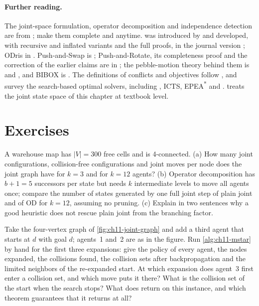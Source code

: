\paragraph{Further reading.}
The joint-space formulation, operator decomposition and independence
detection are from \textcite{standley2010finding}; \textcite{standley2011complete}
make them complete and anytime. \mstar was introduced by
\textcite{wagner2011mstar} and developed, with recursive and inflated
variants and the full proofs, in the journal version
\cite{wagner2015subdimensional}; ODr\mstar is in \cite{ferner2013odrmstar}.
Push-and-Swap is \cite{luna2011push}; Push-and-Rotate, its completeness
proof and the correction of the earlier claims are in \cite{dewilde2014push};
the pebble-motion theory behind them is \cite{kornhauser1984pebble} and
\cite{wilson1974graph}, and BIBOX is \cite{surynek2009novel}. The
definitions of conflicts and objectives follow \textcite{stern2019mapf}, and
\textcite{felner2017search} survey the search-based optimal solvers,
including \cbs, ICTS, EPEA\textsuperscript{*} and \mstar.
\textcite{lavalle2006planning} treats the joint state space of this chapter
at textbook level.

\section{Exercises}
\label{sec:ch11-exercises}

\begin{exercise}[\difficulty{1}]
\label{exr:ch11-sizes}
A warehouse map has $|V| = 300$ free cells and is 4-connected. (a) How many
joint configurations, collision-free configurations and joint moves per
node does the joint graph have for $k = 3$ and for $k = 12$ agents? (b)
Operator decomposition has $b + 1 = 5$ successors per state but needs $k$
intermediate levels to move all agents once; compare the number of states
generated by one full joint step of plain joint \astar and of OD for
$k = 12$, assuming no pruning. (c) Explain in two sentences why a good
heuristic does not rescue plain joint \astar from the branching factor.
\end{exercise}

\begin{exercise}[\difficulty{1}]
\label{exr:ch11-collision-sets}
Take the four-vertex graph of \cref{fig:ch11-joint-graph} and add a third
agent that starts at $d$ with goal $d$; agents~1 and~2 are as in the figure.
Run \cref{alg:ch11-mstar} by hand for the first three expansions: give the
policy of every agent, the nodes expanded, the collisions found, the
collision sets after backpropagation and the limited neighbors of the
re-expanded start. At which expansion does agent~3 first enter a collision
set, and which move puts it there? What is the collision set of the start
when the search stops? What does \mstar return on this instance, and which
theorem guarantees that it returns at all?
\end{exercise}

